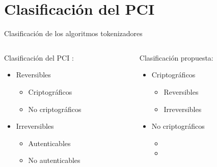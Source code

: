 \documentclass{beamer}
\begin{document}
  \section{Clasificación del PCI}

  \begin{frame}{Clasificación de los algoritmos tokenizadores}
    \begin{center}
      \begin{columns}
        \begin{column}{0.5\textwidth}
          Clasificación del PCI \cite{pci_tokens}:
          \vspace{1.0em}
          \begin{itemize}
            \item Reversibles
            \begin{itemize}
              \item Criptográficos
              \item No criptográficos
            \end{itemize}
            \item Irreversibles
            \begin{itemize}
              \item Autenticables
              \item No autenticables
            \end{itemize}
          \end{itemize}
        \end{column}
        \begin{column}{0.5\textwidth}
          Clasificación propuesta:
          \vspace{1.0em}
          \begin{itemize}
            \item Criptográficos
            \begin{itemize}
              \item Reversibles
              \item Irreversibles
            \end{itemize}
            \item No criptográficos
            \begin{itemize}
              \item[]
              \item[]
            \end{itemize}
          \end{itemize}
        \end{column}
      \end{columns}
    \end{center}
  \end{frame}
\end{document}
